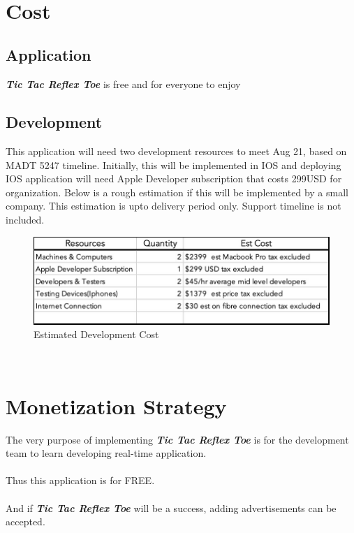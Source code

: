 \documentclass{article}
\begin{document}
~\newline
\section{Cost}
    \subsection{Application}
        \textbf{\emph{Tic Tac Reflex Toe}} is free and for everyone to enjoy
    \subsection{Development} 
        This application will need two development resources to meet Aug 21, based on MADT 5247 timeline.  Initially, this will be implemented in IOS and deploying IOS application will need Apple Developer subscription that costs 299USD for organization.  Below is a rough estimation if this will be implemented by a small company. This estimation is upto delivery period only.  Support timeline is not included.
        \begin{figure}[h]
        \centering
        \includegraphics[width=5in]{images/Cost.jpg}
        \caption{Estimated Development Cost}
        \end{figure}
~\newline
\section{Monetization Strategy}
The very purpose of implementing \textbf{\emph{Tic Tac Reflex Toe}} is for the development team to learn developing real-time application.\\\\Thus this application is for FREE.\\\\And if \textbf{\emph{Tic Tac Reflex Toe}} will be a success, adding advertisements can be accepted.

~\newline
\end{document}
